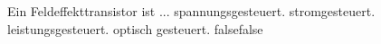     {Ein Feldeffekttransistor ist ...}
    {spannungsgesteuert.}
    {stromgesteuert.}
    {leistungsgesteuert.}
    {optisch gesteuert.}
    {false}{false}